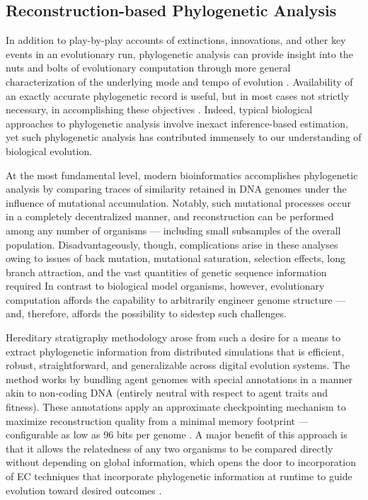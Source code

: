 \subsection{Reconstruction-based Phylogenetic Analysis}

In addition to play-by-play accounts of extinctions, innovations, and other key events in an evolutionary run, phylogenetic analysis can provide insight into the nuts and bolts of evolutionary computation through more general characterization of the underlying mode and tempo of evolution \citep{moreno2023toward,hernandez2022can,shahbandegan2022untangling,lewinsohn2023statedependent}.
Availability of an exactly accurate phylogenetic record is useful, but in most cases not strictly necessary, in accomplishing these objectives \citep{moreno2024ecology}.
Indeed, typical biological approaches to phylogenetic analysis involve inexact inference-based estimation, yet such phylogenetic analysis has contributed immensely to our understanding of biological evolution.

At the most fundamental level, modern bioinformatics accomplishes phylogenetic analysis by comparing traces of similarity retained in DNA genomes under the influence of mutational accumulation.
Notably, such mutational processes occur in a completely decentralized manner, and reconstruction can be performed among any number of organisms --- including small subsamples of the overall population.
Disadvantageously, though, complications arise in these analyses owing to issues of back mutation, mutational saturation, selection effects, long branch attraction, and the vast quantities of genetic sequence information required \citep{TODO}
In contrast to biological model organisms, however, evolutionary computation affords the capability to arbitrarily engineer genome structure --- and, therefore, affords the possibility to sidestep such challenges.

Hereditary stratigraphy methodology arose from such a desire for a means to extract phylogenetic information from distributed simulations that is efficient, robust, straightforward, and generalizable across digital evolution systems.
The method works by bundling agent genomes with special annotations in a manner akin to non-coding DNA (entirely neutral with respect to agent traits and fitness).
These annotations apply an approximate checkpointing mechanism to maximize reconstruction quality from a minimal memory footprint --- configurable as low as 96 bits per genome \citep{moreno2022hereditary}.
A major benefit of this approach is that it allows the relatedness of any two organisms to be compared directly without depending on global information, which opens the door to incorporation of EC techniques that incorporate phylogenetic information at runtime to guide evolution toward desired outcomes \citep{lalejini2024phylogeny,lalejini2024runtime,murphy2008simple,burke2003increased}.

